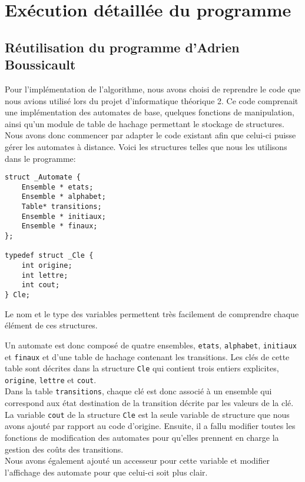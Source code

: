 \documentclass{report}
\begin{document}
\part{Exécution détaillée du programme}

\chapter{Réutilisation du programme d'Adrien Boussicault}
Pour l'implémentation de l'algorithme, nous avons choisi de reprendre le code que nous avions utilisé lors du projet d'informatique théorique 2. Ce code comprenait une implémentation des automates de base, quelques fonctions de manipulation, ainsi qu'un module de table de hachage permettant le stockage de structures.\\ 
Nous avons donc commencer par adapter le code existant afin que celui-ci puisse gérer les automates à distance. Voici les structures telles que nous les utilisons dans le programme:\\

\begin{lstlisting}[frame=single]
struct _Automate {
	Ensemble * etats;
	Ensemble * alphabet;
	Table* transitions;
	Ensemble * initiaux;
	Ensemble * finaux;
};

typedef struct _Cle {
	int origine;
	int lettre;
	int cout;
} Cle;
\end{lstlisting}
$ $\\
Le nom et le type des variables permettent très facilement de comprendre chaque élément de ces structures. 

Un automate est donc composé de quatre ensembles, \verb?etats?, \verb?alphabet?, \verb?initiaux? et \verb?finaux? et d'une table de hachage contenant les transitions. Les clés de cette table sont décrites dans la structure \verb?Cle? qui contient trois entiers explicites, \verb?origine?, \verb?lettre? et \verb?cout?.\\
Dans la table \verb?transitions?, chaque clé est donc associé à un ensemble qui correspond aux état destination de la transition décrite par les valeurs de la clé. La variable \verb?cout? de la structure \verb?Cle? est la seule variable de structure que nous avons ajouté par rapport au code d'origine. Ensuite, il a fallu modifier toutes les fonctions de modification des automates pour qu'elles prennent en charge la gestion des coûts des transitions.\\
Nous avons également ajouté un accesseur pour cette variable et modifier l'affichage des automate pour que celui-ci soit plus clair.\\
\end{document}
